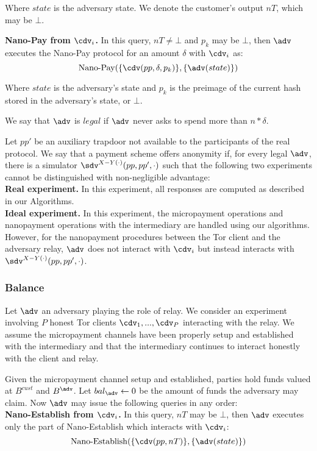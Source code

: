 Where $state$ is the adversary state.
We denote the customer's output $nT$, which may be $\bot$.

\textbf{Nano-Pay from $\cdv_i$.}
In this query, $nT \neq \bot$ and $p_k$ may be $\bot$, then $\adv$ executes the Nano-Pay protocol for an amount $\delta$ with $\cdv_i$ as: $$\operatorname{Nano-Pay}(\{\cdv(pp, \delta, p_k)\}, \{\adv(state)\})$$

Where $state$ is the adversary's state and $p_k$ is the preimage of the current hash stored in the adversary's state, or $\bot$.

We say that $\adv$ is $legal$ if $\adv$ never asks to spend more than $n*\delta$.

Let $pp'$ be an auxiliary trapdoor not available to the participants of the real protocol.
We say that a payment scheme offers anonymity if, for every legal $\adv$, there is a simulator $\sdv^{X-Y(\cdot)}(pp, pp', \cdot)$ such that the following two experiments cannot be distinguished with non-negligible advantage:\\ \textbf{Real experiment.}
In this experiment, all responses are computed as described in our Algorithms.\\ \textbf{Ideal experiment.}
In this experiment, the micropayment operations and nanopayment operations with the intermediary are handled using our algorithms.
However, for the nanopayment procedures between the Tor client and the adversary relay, $\adv$ does not interact with $\cdv_i$ but instead interacts with $\sdv^{X-Y(\cdot)}(pp,pp',\cdot)$.

\subsubsection{Balance}
\label{def:balance}

Let $\adv$ an adversary playing the role of relay.
We consider an experiment involving $P$ honest Tor clients $\cdv_1,..., \cdv_P$ interacting with the relay.
We assume the micropayment channels have been properly setup and established with the intermediary and that the intermediary continues to interact honestly with the client and relay.

Given the micropayment channel setup and established, parties hold funds valued at $B^{cust}$ and $B^{\adv}$.
Let $bal_\adv \leftarrow 0$ be the amount of funds the adversary may claim.
Now $\adv$ may issue the following queries in any order:\\

\textbf{Nano-Establish from $\cdv_i$.}
In this query, $nT$ may be $\bot$, then $\adv$ executes only the part of Nano-Establish which interacts with $\cdv_i$: $$\operatorname{Nano-Establish}(\{\cdv(pp, nT)\}, \{\adv(state)\})$$

